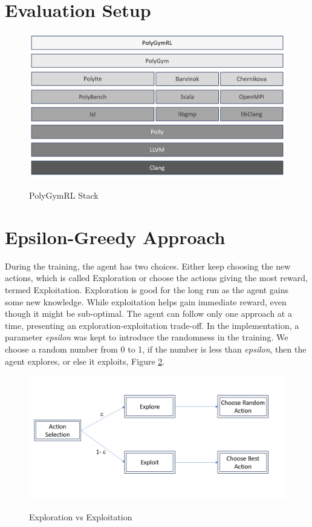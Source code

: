 \documentclass[logo,msc]{infthesis}           %
\begin{document}
\section{Evaluation Setup}

\begin{figure}[htbp]
  \centering
  \includegraphics[width=\textwidth]{Images/PolyGymRlStack.png}
  \label{fig:stack}  
  \caption{PolyGymRL Stack}
\end{figure}

\section{Epsilon-Greedy Approach}

During the training, the agent has two choices. Either keep choosing the new actions, which is called Exploration or choose the actions giving the most reward, termed Exploitation. Exploration is good for the long run as the agent gains some new knowledge. While exploitation helps gain immediate reward, even though it might be sub-optimal. The agent can follow only one approach at a time, presenting an exploration-exploitation trade-off. In the implementation, a parameter \textit{epsilon} was kept to introduce the randomness in the training. We choose a random number from 0 to 1, if the number is less than \textit{epsilon}, then the agent explores, or else it exploits, Figure \ref{fig:randomness}.

\begin{figure}[htbp]
  \centering
  \includegraphics[width=\textwidth]{Images/Randomness.png}
  \label{fig:randomness}  
  \caption{Exploration vs Exploitation}
\end{figure}
\end{document}
